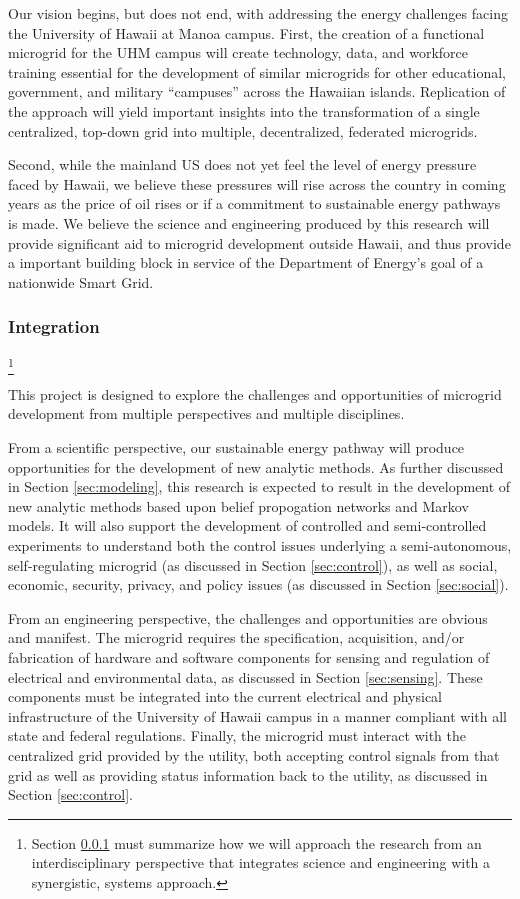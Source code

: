Our vision begins, but does not end, with addressing the energy challenges
facing the University of Hawaii at Manoa campus.  First, the creation of a
functional microgrid for the UHM campus will create technology, data,
and workforce training essential for the development of similar microgrids
for other educational, government, and military ``campuses'' across the
Hawaiian islands.  Replication of the approach will yield important
insights into the transformation of a single centralized, top-down
grid into multiple, decentralized, federated microgrids. 

Second, while the mainland US does not yet feel the level of energy
pressure faced by Hawaii, we believe these pressures will rise across the
country in coming years as the price of oil rises or if a commitment to
sustainable energy pathways is made. We believe the science and engineering
produced by this research will provide significant aid to microgrid
development outside Hawaii, and thus provide a important building block in
service of the Department of Energy's goal of a nationwide Smart Grid.

\subsubsection{Integration}
\label{sec:integration}

\footnote{Section \ref{sec:integration} must summarize how we will approach the research from an
  interdisciplinary perspective that integrates science and engineering
  with a synergistic, systems approach.}

This project is designed to explore the challenges and opportunities of
microgrid development from multiple perspectives and multiple disciplines.   

From a scientific perspective, our sustainable energy pathway will produce
opportunities for the development of new analytic methods.  As further
discussed in Section \ref{sec:modeling}, this research is expected to
result in the development of new analytic methods based upon belief
propogation networks and Markov models.  It will also support the
development of controlled and semi-controlled experiments to understand both
the control issues underlying a semi-autonomous, self-regulating microgrid
(as discussed in Section \ref{sec:control}), as well as social, economic,
security, privacy, and policy issues (as discussed in Section \ref{sec:social}).

From an engineering perspective, the challenges and opportunities are
obvious and manifest.  The microgrid requires the specification,
acquisition, and/or fabrication of hardware and software components for
sensing and regulation of electrical and environmental data, as discussed
in Section \ref{sec:sensing}. These
components must be integrated into the current electrical and physical
infrastructure of the University of Hawaii campus in a manner compliant
with all state and federal regulations.  Finally, the microgrid must
interact with the centralized grid provided by the utility, both accepting
control signals from that grid as well as providing status information back
to the utility, as discussed in Section \ref{sec:control}.

